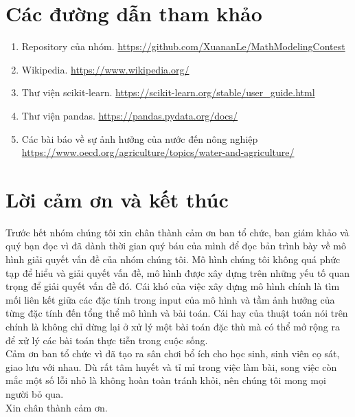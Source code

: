 \documentclass[12pt]{report}
\begin{document}
\chapter*{Các đường dẫn tham khảo} %
\begin{flushleft}
	\begin{enumerate}
		\item Repository của nhóm. \url{https://github.com/XuananLe/MathModelingContest}

		\item Wikipedia. \url{https://www.wikipedia.org/}

		\item Thư viện scikit-learn. \url{https://scikit-learn.org/stable/user_guide.html}

		\item Thư viện pandas. \url{https://pandas.pydata.org/docs/}

		\item Các bài báo về sự ảnh hưởng của nước đến nông nghiệp \url{https://www.oecd.org/agriculture/topics/water-and-agriculture/}
	\end{enumerate}
\end{flushleft}

\chapter*{Lời cảm ơn và kết thúc}
\begin{flushleft}
	Trước hết nhóm chúng tôi xin chân thành cảm ơn ban tổ chức, ban giám khảo và quý bạn đọc vì đã dành thời gian quý báu của mình để đọc bản trình bày về mô hình giải quyết vấn đề của nhóm chúng tôi. Mô hình chúng tôi không quá phức tạp để hiểu và giải quyết vấn đề, mô hình được xây dựng trên những yếu tố quan trọng để giải quyết vấn đề đó. Cái khó của việc xây dựng mô hình chính là tìm mối liên kết giữa các đặc tính trong input của mô hình và tầm ảnh hưởng của từng đặc tính đến tổng thể mô hình và bài toán. Cái hay của thuật toán nói trên chính là không chỉ dừng lại ở xử lý một bài toán đặc thù mà có thể mở rộng ra để xử lý các bài toán thực tiễn trong cuộc sống.
	\\[\baselineskip]

	Cảm ơn ban tổ chức vì đã tạo ra sân chơi bổ ích cho học sinh, sinh viên cọ sát, giao lưu với nhau. Dù rất tâm huyết và tỉ mỉ trong việc làm bài, song việc còn mắc một số lỗi nhỏ là không hoàn toàn tránh khỏi, nên chúng tôi mong mọi người bỏ qua.
	\\[\baselineskip]

	Xin chân thành cảm ơn.
\end{flushleft}
\end{document}
